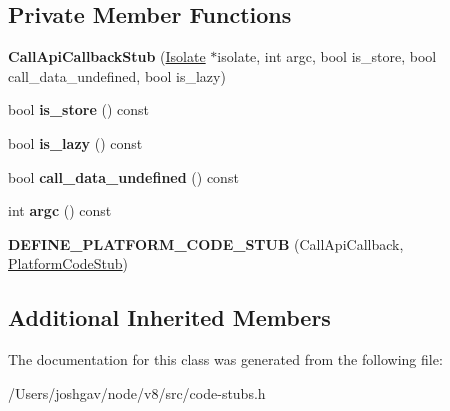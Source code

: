 \subsection*{Private Member Functions}
\begin{DoxyCompactItemize}
\item 
{\bfseries Call\+Api\+Callback\+Stub} (\hyperlink{classv8_1_1internal_1_1_isolate}{Isolate} $\ast$isolate, int argc, bool is\+\_\+store, bool call\+\_\+data\+\_\+undefined, bool is\+\_\+lazy)\hypertarget{classv8_1_1internal_1_1_call_api_callback_stub_a2c3136663936ec72a32547489d185e6f}{}\label{classv8_1_1internal_1_1_call_api_callback_stub_a2c3136663936ec72a32547489d185e6f}

\item 
bool {\bfseries is\+\_\+store} () const \hypertarget{classv8_1_1internal_1_1_call_api_callback_stub_a4db7b4444eacd524ee3d97e3cbceef99}{}\label{classv8_1_1internal_1_1_call_api_callback_stub_a4db7b4444eacd524ee3d97e3cbceef99}

\item 
bool {\bfseries is\+\_\+lazy} () const \hypertarget{classv8_1_1internal_1_1_call_api_callback_stub_ab2adb490481cf144ad063cb8a851f9bd}{}\label{classv8_1_1internal_1_1_call_api_callback_stub_ab2adb490481cf144ad063cb8a851f9bd}

\item 
bool {\bfseries call\+\_\+data\+\_\+undefined} () const \hypertarget{classv8_1_1internal_1_1_call_api_callback_stub_a523f1b846b28ac709c069dccdbeff076}{}\label{classv8_1_1internal_1_1_call_api_callback_stub_a523f1b846b28ac709c069dccdbeff076}

\item 
int {\bfseries argc} () const \hypertarget{classv8_1_1internal_1_1_call_api_callback_stub_a67afb188959038383220b383e675a667}{}\label{classv8_1_1internal_1_1_call_api_callback_stub_a67afb188959038383220b383e675a667}

\item 
{\bfseries D\+E\+F\+I\+N\+E\+\_\+\+P\+L\+A\+T\+F\+O\+R\+M\+\_\+\+C\+O\+D\+E\+\_\+\+S\+T\+UB} (Call\+Api\+Callback, \hyperlink{classv8_1_1internal_1_1_platform_code_stub}{Platform\+Code\+Stub})\hypertarget{classv8_1_1internal_1_1_call_api_callback_stub_aa650a096cb8d53ce7e09c99a0aaf035e}{}\label{classv8_1_1internal_1_1_call_api_callback_stub_aa650a096cb8d53ce7e09c99a0aaf035e}

\end{DoxyCompactItemize}
\subsection*{Additional Inherited Members}


The documentation for this class was generated from the following file\+:\begin{DoxyCompactItemize}
\item 
/\+Users/joshgav/node/v8/src/code-\/stubs.\+h\end{DoxyCompactItemize}
